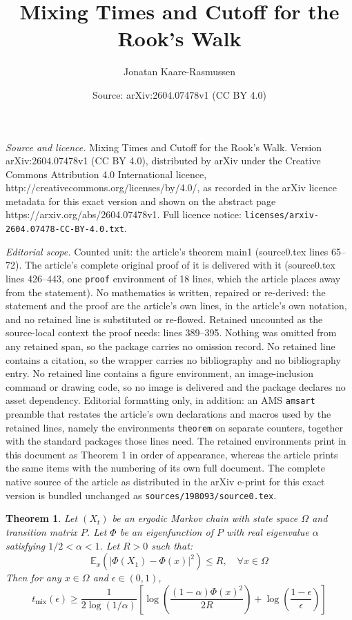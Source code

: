 \documentclass[10pt,a4paper]{amsart}
\title{Mixing Times and Cutoff for the Rook's Walk}
\author{Jonatan Kaare-Rasmussen}
\date{Source: arXiv:2604.07478v1 (CC BY 4.0)}
\newtheorem{theorem}{Theorem}
\begin{document}
\maketitle

\noindent\emph{Source and licence.} Mixing Times and Cutoff for the Rook's Walk. Version arXiv:2604.07478v1 (CC BY 4.0), distributed by arXiv under the Creative Commons Attribution 4.0 International licence, http://creativecommons.org/licenses/by/4.0/, as recorded in the arXiv licence metadata for this exact version and shown on the abstract page https://arxiv.org/abs/2604.07478v1. Full licence notice: \texttt{licenses/arxiv-2604.07478-CC-BY-4.0.txt}.\par\smallskip

\noindent\textit{Editorial scope.} Counted unit: the article's theorem main1 (source0.tex lines 65--72). The article's complete original proof of it is delivered with it (source0.tex lines 426--443, one \texttt{proof} environment of 18 lines, which the article places away from the statement). No mathematics is written, repaired or re-derived: the statement and the proof are the article's own lines, in the article's own notation, and no retained line is substituted or re-flowed.  Retained uncounted as the source-local context the proof needs: lines 389--395.  Nothing was omitted from any retained span, so the package carries no omission record.  No retained line contains a citation, so the wrapper carries no bibliography and no bibliography entry.  No retained line contains a figure environment, an image-inclusion command or drawing code, so no image is delivered and the package declares no asset dependency.  Editorial formatting only, in addition: an AMS \texttt{amsart} preamble that restates the article's own declarations and macros used by the retained lines, namely the environments \texttt{theorem} on separate counters, together with the standard packages those lines need.  The retained environments print in this document as Theorem 1 in order of appearance, whereas the article prints the same items with the numbering of its own full document.  The complete native source of the article as distributed in the arXiv e-print for this exact version is bundled unchanged as \texttt{sources/198093/source0.tex}.
\begin{theorem}
   \label{wilson}
   Let $(X_t)$ be an ergodic Markov chain with state space $\Omega$ and transition matrix $P$. Let $\Phi$ be an eigenfunction of $P$ with real eigenvalue $\alpha$ satisfying $1/2 < \alpha< 1$. Let $R>0$ such that:
   \[\mathbb{E}_x\left(|\Phi(X_1)-\Phi(x)|^2\right)\leq R,\quad \forall x\in \Omega\]
   Then for any $x\in \Omega$ and $\epsilon\in (0,1)$,
   \[t_\text{mix}(\epsilon) \geq \frac{1}{2\log(1/\alpha)}\left[\log \left(\frac{(1-\alpha)\Phi(x)^2}{2R}\right) + \log\left(\frac{1-\epsilon}{\epsilon}\right)\right]\]
\end{theorem}
\end{document}
